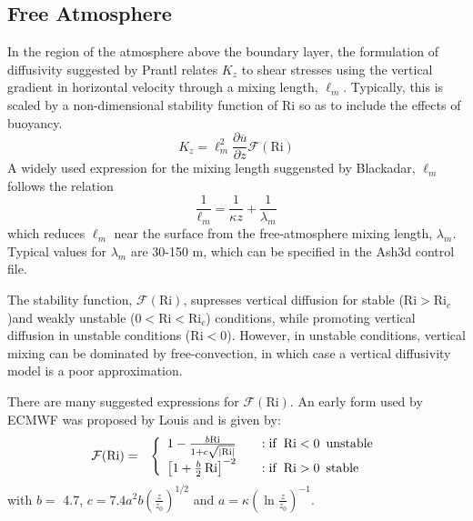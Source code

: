 \subsection{Free Atmosphere}
In the region of the atmosphere above the boundary layer, the formulation of diffusivity
suggested by Prantl relates $K_z$ to shear stresses using the vertical gradient in
horizontal velocity through a mixing length, $\ell_m$. %
Typically, this is scaled by a non-dimensional stability function of $\mathrm{Ri}$ so as to
include the effects of buoyancy.
\begin{equation}\label{VarDiff_Eq_Kz_FreAtmos}
K_z = \ell_m^2 \frac{\partial \overline{u}}{\partial z}  \mathcal{F}(\mathrm{Ri})
\end{equation}
A widely used expression for the mixing length suggensted by Blackadar, $\ell_m$ follows the relation
\begin{equation}\label{VarDiff_Eq_MixLen}
\frac{1}{\ell_m} = \frac{1}{\kappa z} + \frac{1}{\lambda_m}
\end{equation}
which reduces $\ell_m$ near the surface from the free-atmosphere mixing length, $\lambda_m$. Typical
values for $\lambda_m$ are 30-150 $\mathrm{m}$, which can be specified in the Ash3d control file.

The stability function, $\mathcal{F}(\mathrm{Ri})$, supresses vertical diffusion for stable
($\mathrm{Ri}>\mathrm{Ri}_c$)and weakly unstable ($0<\mathrm{Ri} < \mathrm{Ri}_c$) conditions,
while promoting vertical diffusion in unstable conditions ($\mathrm{Ri}<0$).
However, in unstable conditions, vertical mixing
can be dominated by free-convection, in which case a vertical diffusivity model is a poor approximation.


There are many suggested expressions for $\mathcal{F}(\mathrm{Ri})$. An early form used by ECMWF was proposed
by Louis \cite{Louis1979} and is given by:
\begin{eqnarray}\label{VarDiff_Eq_F_Louis}
\mathcal{F}(\mathrm{Ri}) &=& \left\{ \begin{array} {l@{\quad \quad}l}
 1 - \frac{b \mathrm{Ri}}{1+c \sqrt{\left| \mathrm{Ri}\right|}}  &: \mathrm{if}\,\,\, \mathrm{Ri} < 0 \,\,\, \mathrm{unstable} \\
 \left[ 1+ \frac{b}{2} \, \mathrm{Ri} \right]^{-2}               &: \mathrm{if}\,\,\, \mathrm{Ri} > 0 \,\,\, \mathrm{stable}
\end{array}
\right.
\end{eqnarray}
with $b =$ 4.7, $c=7.4 a^2b \left( \frac{z}{z_0} \right)^{1/2}$ and $a=\kappa \left(\ln{\frac{z}{z_0}} \right)^{-1}$.

